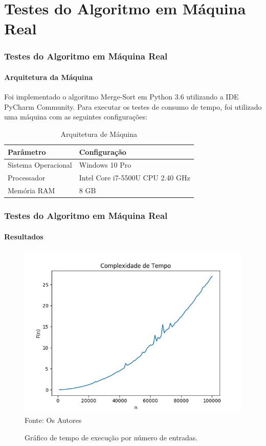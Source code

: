 \documentclass[aspectratio=169]{beamer}
\begin{document}

	\section{Testes do Algoritmo em Máquina Real}
	\begin{frame}
		\frametitle{Testes do Algoritmo em Máquina Real}
		\framesubtitle{Arquitetura da Máquina}
		Foi implementado o algoritmo Merge-Sort em Python 3.6 utilizando a IDE PyCharm Community. Para executar os testes de consumo de tempo, foi utilizado uma máquina com as seguintes configurações:
		
\begin{table}[H]
	\centering
	\caption{Arquitetura de Máquina}
	\label{my-label}
	\begin{tabular}{@{}|l|l|@{}}
		\toprule
		\textbf{Parâmetro}  & \textbf{Configuração}            \\ \midrule
		Sistema Operacional & Windows 10 Pro                   \\ \midrule
		Processador         & Intel Core i7-5500U CPU 2.40 GHz \\ \midrule
		Memória RAM         & 8 GB                             \\ \bottomrule
	\end{tabular}
\end{table}

	\end{frame}


	\begin{frame}
	\frametitle{Testes do Algoritmo em Máquina Real}
	\framesubtitle{Resultados}
	
	\begin{figure}
		\centering
		\caption{Gráfico de tempo de execução por número de entradas.}
		\includegraphics[width=.47\linewidth]{grafico.jpg}\\
		\footnotesize{Fonte: Os Autores}
		\label{grafico}
	\end{figure} 

	\end{frame}
\end{document}
